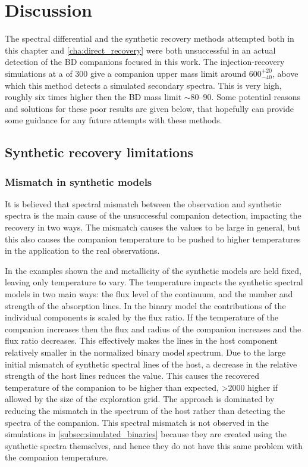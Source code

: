 
\section{Discussion}
\label{sec:chisquared_discussion}
The spectral differential and the synthetic recovery methods attempted both in this chapter and \cref{cha:direct_recovery} were both unsuccessful in an actual detection of the {BD} companions focused in this work.
The injection-recovery simulations at a \snr{} of 300 give a companion upper mass limit around \(600^{+20}_{-40}\), above which this method detects a simulated secondary spectra.
This is very high, roughly six times higher then the {BD} mass limit \(\sim\)80--90\Mjup{}.
Some potential reasons and solutions for these poor results are given below, that hopefully can provide some guidance for any future attempts with these methods.

\subsection{Synthetic recovery limitations}
\label{subsec:limitations}

\subsubsection{Mismatch in synthetic models}
\label{subsubsec:mismatch}
It is believed that spectral mismatch between the observation and synthetic spectra is the main cause of the unsuccessful companion detection, impacting the recovery in two ways.
The mismatch causes the \textchisquared{} values to be large in general, but this also causes the companion temperature to be pushed to higher temperatures in the application to the real observations.

In the examples shown the \Logg{} and metallicity of the synthetic models are held fixed, leaving only temperature to vary.
The temperature impacts the synthetic spectral models in two main ways: the flux level of the continuum, and the number and strength of the absorption lines.
In the binary model the contributions of the individual components is scaled by the flux ratio.
If the temperature of the companion increases then the flux and radius of the companion increases and the flux ratio \FoneFtwo{} decreases.
This effectively makes the lines in the host component relatively smaller in the normalized binary model spectrum.
Due to the large initial mismatch of synthetic spectral lines of the host, a decrease in the relative strength of the host lines reduces the \textchisquared{} value.
This causes the recovered temperature of the companion to be higher than expected, >2000\K{} higher if allowed by the size of the exploration grid.
The \textchisquared{} approach is dominated by reducing the mismatch in the spectrum of the host rather than detecting the spectra of the companion.
This spectral mismatch is not observed in the simulations in \cref{subsec:simulated_binaries} because they are created using the synthetic spectra themselves, and hence they do not have this same problem with the companion temperature.

